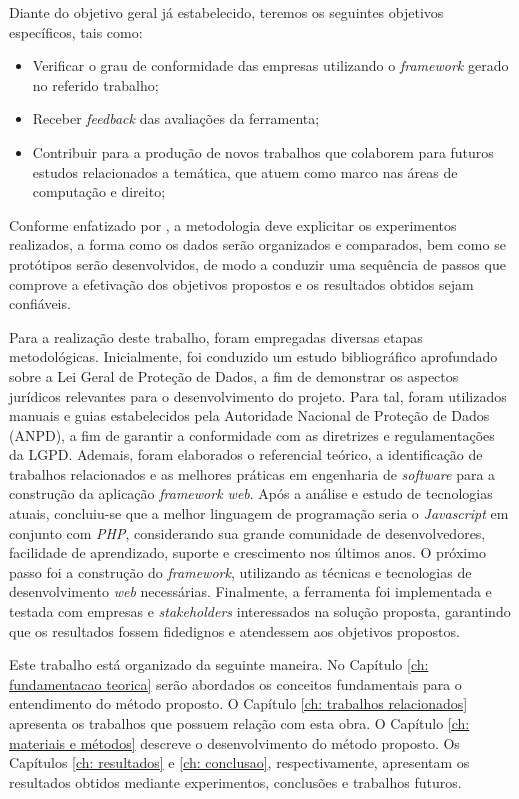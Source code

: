 \documentclass[
	12pt,				%
	openright,			%
	oneside,			%
	a4paper,			%
	english,			%
	french,				%
	spanish,			%
	brazil,				%
	]{abntex2}
\begin{document}
Diante do objetivo geral já estabelecido, teremos os seguintes objetivos específicos, tais como:
\begin{itemize}
\item Verificar o grau de conformidade das empresas utilizando o \textit{framework} gerado no referido trabalho;
\item Receber \textit{feedback} das avaliações da ferramenta;
\item Contribuir para a produção de novos trabalhos que colaborem para futuros estudos relacionados a temática, que atuem como marco nas áreas de computação e direito;
\end{itemize}

Conforme enfatizado por , a metodologia deve explicitar os experimentos realizados, a forma como os dados serão organizados e comparados, bem como se protótipos serão desenvolvidos, de modo a conduzir uma sequência de passos que comprove a efetivação dos objetivos propostos e os resultados obtidos sejam confiáveis.


Para a realização deste trabalho, foram empregadas diversas etapas metodológicas. Inicialmente, foi conduzido um estudo bibliográfico aprofundado sobre a Lei Geral de Proteção de Dados, a fim de demonstrar os aspectos jurídicos relevantes para o desenvolvimento do projeto.
Para tal, foram utilizados manuais e guias estabelecidos pela Autoridade Nacional de Proteção de Dados (ANPD), a fim de garantir a conformidade com as diretrizes e regulamentações da LGPD. Ademais, foram elaborados o referencial teórico, a identificação de trabalhos relacionados e as melhores práticas em engenharia de \textit{software} para a construção da aplicação \textit{framework web}.
Após a análise e estudo de tecnologias atuais, concluiu-se que a melhor linguagem de programação seria o \textit{Javascript} em conjunto com \textit{PHP}, considerando sua grande comunidade de desenvolvedores, facilidade de aprendizado, suporte e crescimento nos últimos anos.  
O próximo passo foi a construção do \textit{framework}, utilizando as técnicas e tecnologias de desenvolvimento \textit{web} necessárias. Finalmente, a ferramenta foi implementada e testada com empresas e \textit{stakeholders} interessados na solução proposta, garantindo que os resultados fossem fidedignos e atendessem aos objetivos propostos.
 




Este trabalho está organizado da seguinte maneira. No Capítulo \ref{ch: fundamentacao teorica} serão abordados os conceitos fundamentais para o entendimento do método proposto. O Capítulo \ref{ch: trabalhos relacionados} apresenta os trabalhos que possuem relação com esta obra. O Capítulo \ref{ch: materiais e métodos} descreve o desenvolvimento do método proposto. Os Capítulos \ref{ch: resultados} e \ref{ch: conclusao}, respectivamente, apresentam os resultados obtidos mediante experimentos, conclusões e trabalhos futuros.
\end{document}
